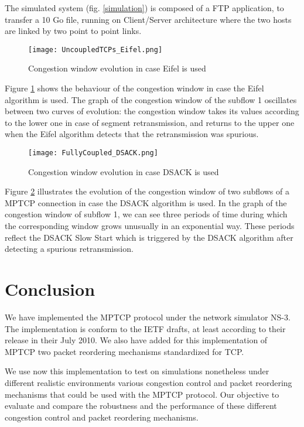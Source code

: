 \documentclass{sig-alternate}
\begin{document}
The simulated system (fig. \ref{simulation}) is composed of a FTP application, to transfer a 10 Go file, running on Client/Server architecture where the two hosts are linked by two point to point links. 



\begin{figure}
\centering
\texttt{[image: UncoupledTCPs\_Eifel.png]} 
\caption{Congestion window evolution in case Eifel is used}
\label{cwndEifel}
\end{figure}


Figure \ref{cwndEifel} shows the behaviour of the congestion window in case the Eifel algorithm is used. The graph of the congestion window of the subflow 1 oscillates between two curves of evolution: the congestion window takes its values according to the lower one in case of segment retransmission, and returns to the upper one when the Eifel algorithm detects that the retransmission was spurious. 


\begin{figure}
\centering
\texttt{[image: FullyCoupled\_DSACK.png]} 
\caption{Congestion window evolution in case DSACK is used}
\label{cwndDsack}
\end{figure} 


Figure \ref{cwndDsack} illustrates the evolution of the congestion window of two subflows of a MPTCP connection in case the DSACK algorithm is used. In the graph of the congestion window of subflow 1, we can see three periods of time during which the corresponding window grows unusually in an exponential way. These periods reflect the DSACK Slow Start which is triggered by the DSACK algorithm after detecting a spurious retransmission.





\section{Conclusion}\label{sec:conclusion}

We have implemented the MPTCP protocol under the network simulator NS-3. The implementation is conform to the IETF drafts, at least according to their release in their July 2010. We also have added for this implementation of MPTCP two packet reordering mechanisms standardized for TCP.

We use now this implementation to test on simulations nonetheless under different realistic environments various congestion control and packet reordering mechanisms that could be used with the MPTCP protocol. Our objective to evaluate and compare the robustness and the performance of these different congestion control and packet reordering mechanisms.  
\end{document}
